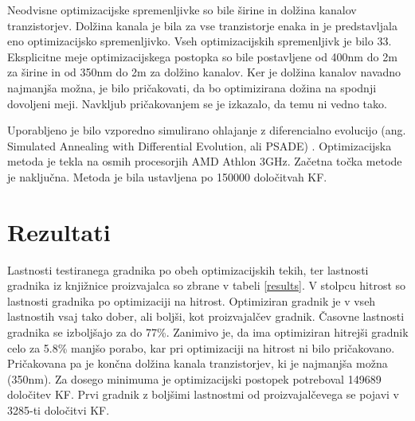 \documentclass[journal,a4paper,twoside]{sty/IEEEtran}
\begin{document}
Neodvisne optimizacijske spremenljivke so bile širine in dolžina kanalov tranzistorjev. Dolžina kanala je bila za vse tranzistorje enaka in je predstavljala eno optimizacijsko spremenljivko. Vseh optimizacijskih spremenljivk je bilo 33. Eksplicitne meje optimizacijskega postopka so bile postavljene od 400nm do 2\textmu m za širine in od 350nm do 2\textmu m za dolžino kanalov. Ker je dolžina kanalov navadno najmanjša možna, je bilo pričakovati, da bo optimizirana dožina na spodnji dovoljeni meji. Navkljub pričakovanjem se je izkazalo, da temu ni vedno tako.

Uporabljeno je bilo vzporedno simulirano ohlajanje z diferencialno evolucijo (ang. Simulated Annealing with Differential Evolution, ali PSADE) \cite{olensek}. Optimizacijska metoda je tekla na osmih procesorjih AMD Athlon 3GHz. Začetna točka metode je naključna. Metoda je bila ustavljena po 150000 določitvah KF.

\section{Rezultati}
Lastnosti testiranega gradnika po obeh optimizacijskih tekih, ter lastnosti gradnika iz knjižnice proizvajalca so zbrane v tabeli \ref{results}. V stolpcu hitrost so lastnosti gradnika po optimizaciji na hitrost. Optimiziran gradnik je v vseh lastnostih vsaj tako dober, ali boljši, kot proizvajalčev gradnik. Časovne lastnosti gradnika se izboljšajo za do 77\%. Zanimivo je, da ima optimiziran hitrejši gradnik celo za 5.8\% manjšo porabo, kar pri optimizaciji na hitrost ni bilo pričakovano. Pričakovana pa je končna dolžina kanala tranzistorjev, ki je najmanjša možna (350nm). Za dosego minimuma je optimizacijski postopek potreboval 149689 določitev KF. Prvi gradnik z boljšimi lastnostmi od proizvajalčevega se pojavi v 3285-ti določitvi KF.
\end{document}
